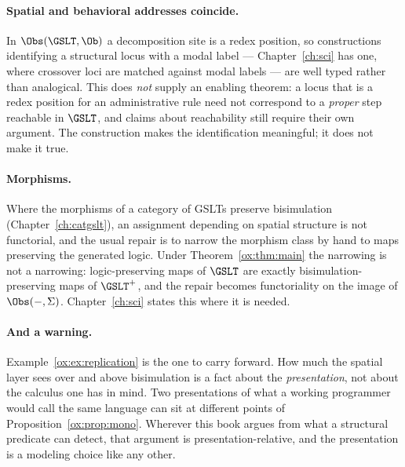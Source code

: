 \paragraph{Spatial and behavioral addresses coincide.}
In $\Obs(\GSLT,\Ob)$ a decomposition site is a redex position, so constructions
identifying a structural locus with a modal label --- Chapter~\ref{ch:sci} has one,
where crossover loci are matched against modal labels --- are well typed rather than
analogical. This does \emph{not} supply an enabling theorem: a locus that is a redex
position for an administrative rule need not correspond to a \emph{proper} step
reachable in $\GSLT$, and claims about reachability still require their own
argument. The construction makes the identification meaningful; it does not make it
true.

\paragraph{Morphisms.}
Where the morphisms of a category of GSLTs preserve bisimulation
(Chapter~\ref{ch:catgslt}), an assignment depending on spatial structure is not
functorial, and the usual repair is to narrow the morphism class by hand to maps
preserving the generated logic. Under Theorem~\ref{ox:thm:main} the narrowing is not
a narrowing: logic-preserving maps of $\GSLT$ are exactly bisimulation-preserving
maps of $\GSLT^{+}$, and the repair becomes functoriality on the image of
$\Obs(-,\Sigma)$. Chapter~\ref{ch:sci} states this where it is needed.

\paragraph{And a warning.}
Example~\ref{ox:ex:replication} is the one to carry forward. How much the spatial
layer sees over and above bisimulation is a fact about the \emph{presentation}, not
about the calculus one has in mind. Two presentations of what a working programmer
would call the same language can sit at different points of
Proposition~\ref{ox:prop:mono}. Wherever this book argues from what a structural
predicate can detect, that argument is presentation-relative, and the presentation
is a modeling choice like any other.

